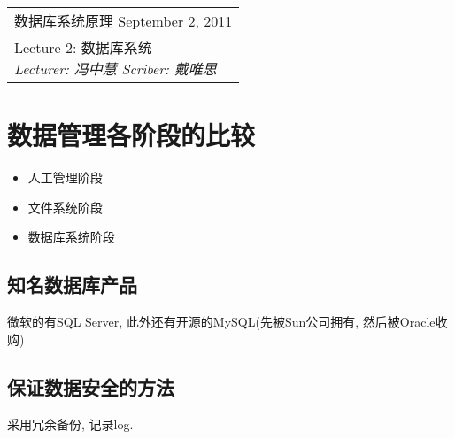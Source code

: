 \clearpage \noindent\begin{tabularx}{\linewidth}{|X|}
\hline \vskip -2mm
{\sf 数据库系统原理} \hfill September 2, 2011 \\
{\centering \sf \large Lecture 2:
数据库系统 \\ }
\textsl{Lecturer: 冯中慧 \hfill Scriber: 戴唯思}\\ \hline
\end{tabularx}
\setcounter{section}{0}
\renewcommand{\thepage}{\lecture -\arabic{page}}
\def\lecture{2}

\section{数据管理各阶段的比较}

    \begin{itemize}
        \item 人工管理阶段
        \item 文件系统阶段
        \item 数据库系统阶段
    \end{itemize}

    \subsection{知名数据库产品}

        微软的有SQL Server, 此外还有开源的MySQL(先被Sun公司拥有, 然后被Oracle收购)

    \subsection{保证数据安全的方法}

        采用冗余备份, 记录log.
        
